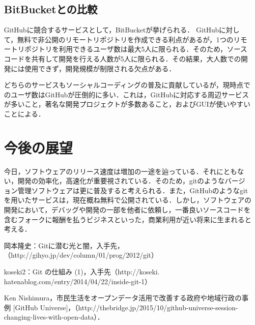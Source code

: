 \documentclass[a4j,9pt,twocolumn]{jsarticle}
\begin{document}
\subsection{BitBucketとの比較}
GitHubに競合するサービスとして，BitBucketが挙げられる． GitHubに対して，無料で非公開のリモートリポジトリを作成できる利点があるが，1つのリモートリポジトリを利用できるユーザ数は最大5人に限られる．そのため，ソースコードを共有して開発を行える人数が5人に限られる．その結果，大人数での開発には使用できず，開発規模が制限される欠点がある．

どちらのサービスもソーシャルコーディングの普及に貢献しているが，現時点でのユーザ数はGitHubが圧倒的に多い．これは，GitHubに対応する周辺サービスが多いこと，著名な開発プロジェクトが多数あること，およびGUIが使いやすいことによる．

\section{今後の展望}
今日，ソフトウェアのリリース速度は増加の一途を辿っている．それにともない，開発の効率化，高速化が重要視されている．そのため，gitのようなバージョン管理ソフトウェアは更に普及すると考えられる．また，GitHubのようなgitを用いたサービスは，現在概ね無料で公開されている．しかし，ソフトウェアの開発において，デバッグや開発の一部を他者に依頼し，一番良いソースコードを含むフォークに報酬を払うビジネスといった，商業利用が近い将来に生まれると考える．

\small
\begin{thebibliography}{99}
岡本隆史：Gitに潜む光と闇，入手先，（http://gihyo.jp/dev/column/01/prog/2012/git）

koseki2：Git の仕組み (1)，入手先（http://koseki.\\hatenablog.com/entry/2014/04/22/inside-git-1）

Ken Nishimura，市民生活をオープンデータ活用で改善する政府や地域行政の事例 [GitHub Universe]，（http://thebridge.jp/2015/10/github-universe-session-changing-lives-with-open-data）．
\end{thebibliography}
\end{document}
